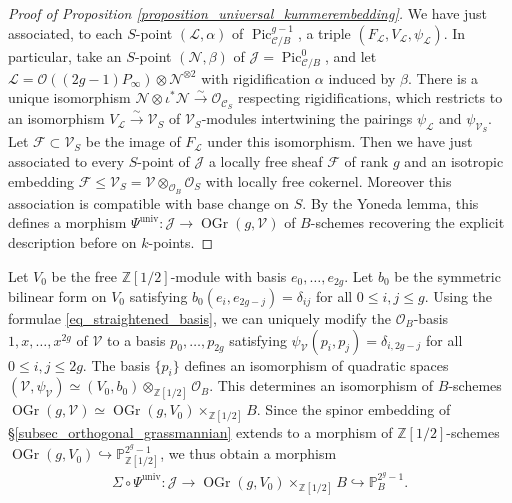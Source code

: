 \documentclass{article} %
\numberwithin{equation}{section}
\DeclareMathOperator{\Pic}{Pic}
\newcommand{\sh}[1]{\mathscr{#1}}
\renewcommand{\P}{\mathbb{P}}
\renewcommand{\O}{\mathcal{O}}
\newcommand{\Z}{\mathbb{Z}}
\DeclareMathOperator{\OGr}{OGr}
\begin{document}
\begin{proof}[Proof of Proposition \ref{proposition_universal_kummerembedding}]
    We have just associated, to each $S$-point $(\sh{L}, \alpha)$ of $\Pic_{\mathcal{C}/B}^{g-1}$, a triple $(F_{\sh{L}}, V_{\sh{L}}, \psi_{\sh{L}})$.
In particular, take an $S$-point $(\sh{N}, \beta)$ of $\mathcal{J} = \Pic_{\mathcal{C}/B}^0$, and let $\sh{L} = \O((2g-1)P_{\infty}) \otimes \sh{N}^{\otimes 2}$ with rigidification $\alpha$ induced by $\beta$. 
There is a unique isomorphism $\sh{N} \otimes \iota^*\sh{N}\xrightarrow{\sim} \O_{\mathcal{C}_S}$ respecting rigidifications, which restricts to an isomorphism $V_{\sh{L}} \xrightarrow{\sim} \sh{V}_S$ of $\sh{V}_S$-modules intertwining the pairings $\psi_{\sh{L}}$ and $\psi_{\sh{V}_S}$.
Let $\sh{F}\subset \sh{V}_S$ be the image of $F_{\sh{L}}$ under this isomorphism. 
Then we have just associated to every $S$-point of $\mathcal{J}$ a locally free sheaf $\sh{F}$ of rank $g$ and an isotropic embedding $\sh{F} \leq \sh{V}_S = \sh{V} \otimes_{\O_B} \O_S$ with locally free cokernel.
Moreover this association is compatible with base change on $S$.
By the Yoneda lemma, this defines a morphism $\Psi^{\mathrm{univ}} \colon \mathcal{J}\rightarrow \OGr(g, \sh{V})$ of $B$-schemes recovering the explicit description before on $k$-points.
\end{proof}







Let $V_0$ be the free $\Z[1/2]$-module with basis $e_0, \dots, e_{2g}$.
Let $b_0$ be the symmetric bilinear form on $V_0$ satisfying $b_0(e_i, e_{2g-j}) = \delta_{ij}$ for all $0\leq i,j\leq g$.
Using the formulae \eqref{eq_straightened_basis}, we can uniquely modify the $\O_B$-basis $1, x, \dots, x^{2g}$ of $\sh{V}$ to a basis $p_0, \dots, p_{2g}$ satisfying $\psi_{\sh{V}}(p_i,p_{j}) = \delta_{i,2g-j}$ for all $0\leq i,j\leq 2g$.
The basis $\{p_i\}$ defines an isomorphism of quadratic spaces $(\sh{V}, \psi_{\sh{V}})\simeq (V_0,b_0)\otimes_{\Z[1/2]} \O_B$.
This determines an isomorphism of $B$-schemes $\OGr(g,\sh{V}) \simeq \OGr(g,V_0) \times_{\Z[1/2]} B$.
Since the spinor embedding of \S\ref{subsec_orthogonal_grassmannian} extends to a morphism of $\Z[1/2]$-schemes $\OGr(g,V_0) \hookrightarrow \P^{2^g-1}_{\Z[1/2]}$, we thus obtain a morphism
\begin{align}\label{eq_universal_kummer_embedding}
    \Sigma\circ \Psi^{\mathrm{univ}}\colon \mathcal{J} \rightarrow \OGr(g, V_0)\times_{\Z[1/2]} B \hookrightarrow \P^{2^g-1}_B.
\end{align}
\end{document}
